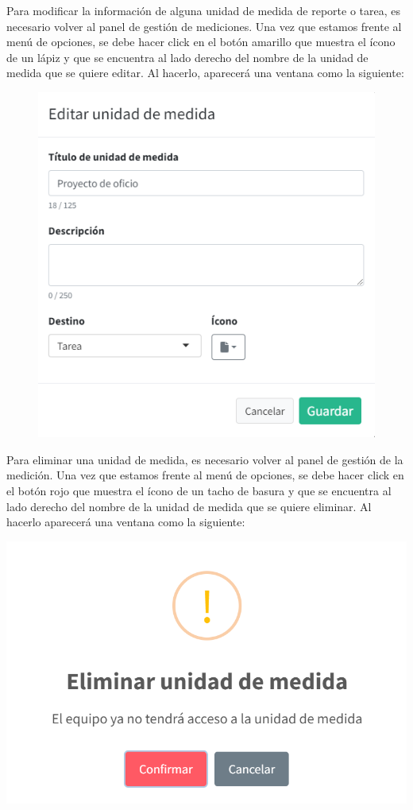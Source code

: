 \documentclass[
  letterpaper,
  DIV=11,
  numbers=noendperiod]{scrreprt}
\begin{document}
Para modificar la información de alguna unidad de medida de reporte o
tarea, es necesario volver al panel de gestión de mediciones. Una vez
que estamos frente al menú de opciones, se debe hacer click en el botón
amarillo que muestra el ícono de un lápiz y que se encuentra al lado
derecho del nombre de la unidad de medida que se quiere editar. Al
hacerlo, aparecerá una ventana como la siguiente:

\begin{figure}

{\centering \includegraphics{./img/manual-admin/Editar unidad de medida.png}

}

\end{figure}

Para eliminar una unidad de medida, es necesario volver al panel de
gestión de la medición. Una vez que estamos frente al menú de opciones,
se debe hacer click en el botón rojo que muestra el ícono de un tacho de
basura y que se encuentra al lado derecho del nombre de la unidad de
medida que se quiere eliminar. Al hacerlo aparecerá una ventana como la
siguiente:

\includegraphics{./img/manual-admin/Eliminar unidad de medida.png}
\end{document}
